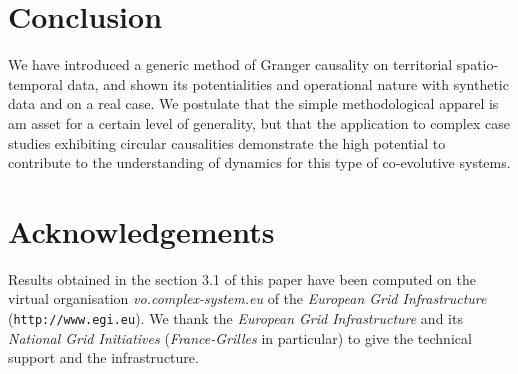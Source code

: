 \documentclass[english]{./sageo}
\begin{document}
\section{Conclusion}

We have introduced a generic method of Granger causality on territorial spatio-temporal data, and shown its potentialities and operational nature with synthetic data and on a real case. We postulate that the simple methodological apparel is am asset for a certain level of generality, but that the application to complex case studies exhibiting circular causalities demonstrate the high potential to contribute to the understanding of dynamics for this type of co-evolutive systems.



\section*{Acknowledgements}

Results obtained in the section 3.1 of this paper have been computed on the virtual organisation \textit{vo.complex-system.eu} of the \textit{European Grid Infrastructure} (\texttt{http://www.egi.eu}). We thank the \textit{European Grid Infrastructure} and its \textit{National Grid Initiatives} (\textit{France-Grilles} in particular) to give the technical support and the infrastructure.


\end{document}
